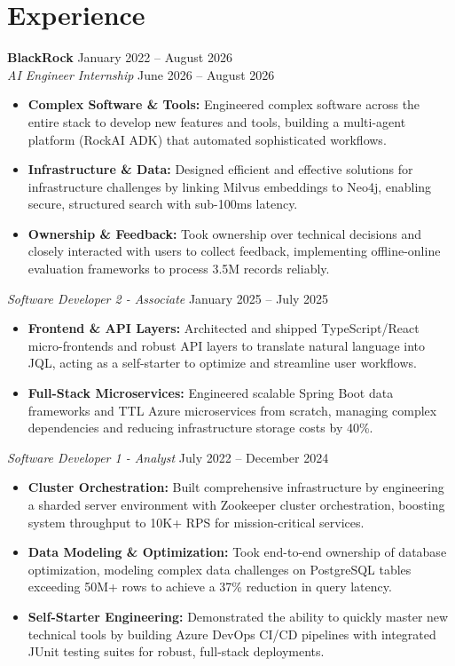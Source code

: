 \documentclass[11pt,a4paper]{article}
\begin{document}
\section{Experience}
\noindent
\textbf{BlackRock} \hfill January 2022 -- August 2026 \\
\textit{AI Engineer Internship} \hfill June 2026 -- August 2026
\begin{itemize}[leftmargin=*,noitemsep,topsep=0pt]
    \item \textbf{Complex Software \& Tools:} Engineered complex software across the entire stack to develop new features and tools, building a multi-agent platform (RockAI ADK) that automated sophisticated workflows.
    \item \textbf{Infrastructure \& Data:} Designed efficient and effective solutions for infrastructure challenges by linking Milvus embeddings to Neo4j, enabling secure, structured search with sub-100ms latency.
    \item \textbf{Ownership \& Feedback:} Took ownership over technical decisions and closely interacted with users to collect feedback, implementing offline-online evaluation frameworks to process 3.5M records reliably.
\end{itemize}

\vspace{3pt}
\noindent
\textit{Software Developer 2 - Associate} \hfill January 2025 -- July 2025
\begin{itemize}[leftmargin=*,noitemsep,topsep=0pt]
    \item \textbf{Frontend \& API Layers:} Architected and shipped TypeScript/React micro-frontends and robust API layers to translate natural language into JQL, acting as a self-starter to optimize and streamline user workflows.
    \item \textbf{Full-Stack Microservices:} Engineered scalable Spring Boot data frameworks and TTL Azure microservices from scratch, managing complex dependencies and reducing infrastructure storage costs by 40\%.
\end{itemize}

\vspace{3pt}
\noindent
\textit{Software Developer 1 - Analyst} \hfill July 2022 -- December 2024
\begin{itemize}[leftmargin=*,noitemsep,topsep=0pt]
    \item \textbf{Cluster Orchestration:} Built comprehensive infrastructure by engineering a sharded server environment with Zookeeper cluster orchestration, boosting system throughput to 10K+ RPS for mission-critical services.
    \item \textbf{Data Modeling \& Optimization:} Took end-to-end ownership of database optimization, modeling complex data challenges on PostgreSQL tables exceeding 50M+ rows to achieve a 37\% reduction in query latency.
    \item \textbf{Self-Starter Engineering:} Demonstrated the ability to quickly master new technical tools by building Azure DevOps CI/CD pipelines with integrated JUnit testing suites for robust, full-stack deployments.
\end{itemize}
\end{document}
